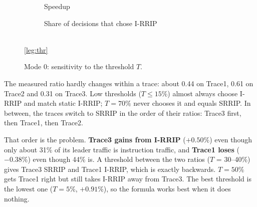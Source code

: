 \tThr
\begin{figure}[H]
\centering
\begin{subfigure}{0.49\textwidth}\centering
  \caption{Speedup}
\end{subfigure}\hfill
\begin{subfigure}{0.49\textwidth}\centering
  \caption{Share of decisions that chose I-RRIP}
\end{subfigure}\\[3pt]
\ref*{leg:thr}
\caption{Mode 0: sensitivity to the threshold $T$.}
\label{fig:t2b-thr}
\end{figure}

The measured ratio hardly changes within a trace: about 0.44 on Trace1, 0.61 on Trace2 and 0.31 on Trace3.
Low thresholds ($T \le 15\%$) almost always choose I-RRIP and match static I-RRIP; $T = 70\%$ never chooses it and
equals SRRIP. In between, the traces switch to SRRIP in the order of their ratios: Trace3 first, then Trace1, then Trace2.

That order is the problem. \textbf{Trace3 gains from I-RRIP} ($+0.50\%$) even though only about 31\% of its leader
traffic is instruction traffic, and \textbf{Trace1 loses} ($-0.38\%$) even though 44\% is. A threshold between the two
ratios ($T$ = 30--40\%) gives Trace3 SRRIP and Trace1 I-RRIP, which is exactly backwards. $T = 50\%$ gets Trace1 right
but still takes I-RRIP away from Trace3. The best threshold is the lowest one ($T = 5\%$, $+0.91\%$), so the formula
works best when it does nothing.

